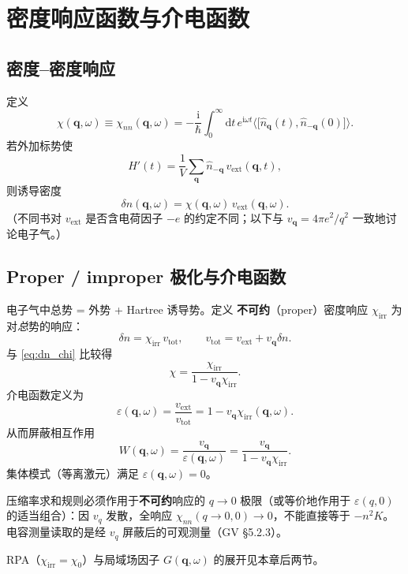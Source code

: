 \section{密度响应函数与介电函数}

\subsection{密度--密度响应}

定义
\begin{equation}
  \chi(\mathbf{q},\omega)
  \equiv\chi_{nn}(\mathbf{q},\omega)
  =-\frac{\mathrm{i}}{\hbar}
  \int_0^{\infty}\mathrm{d}t\,
  e^{\mathrm{i}\omega t}
  \bigl\langle
  \bigl[\hat n_{\mathbf{q}}(t),\hat n_{-\mathbf{q}}(0)\bigr]
  \bigr\rangle.
\label{eq:chinndef}
\end{equation}
若外加标势使
\begin{equation}
  H'(t)
  =\frac{1}{V}\sum_{\mathbf{q}}
  \hat n_{-\mathbf{q}}\,
  v_{\mathrm{ext}}(\mathbf{q},t),
\end{equation}
则诱导密度
\begin{equation}
  \delta n(\mathbf{q},\omega)
  =\chi(\mathbf{q},\omega)\,
  v_{\mathrm{ext}}(\mathbf{q},\omega).
\label{eq:dn_chi}
\end{equation}
（不同书对 $v_{\mathrm{ext}}$ 是否含电荷因子 $-e$ 的约定不同；以下与 $v_{\mathbf{q}}=4\pi e^2/q^2$ 一致地讨论电子气。）

\subsection{Proper / improper 极化与介电函数}

电子气中总势 = 外势 + Hartree 诱导势。定义 \textbf{不可约}（proper）密度响应 $\chi_{\mathrm{irr}}$ 为对\textit{总}势的响应：
\begin{equation}
  \delta n=\chi_{\mathrm{irr}}\,v_{\mathrm{tot}},
  \qquad
  v_{\mathrm{tot}}=v_{\mathrm{ext}}+v_{\mathbf{q}}\delta n.
\end{equation}
与 \eqref{eq:dn_chi} 比较得
\begin{equation}
  \chi
  =\frac{\chi_{\mathrm{irr}}}
  {1-v_{\mathbf{q}}\chi_{\mathrm{irr}}}.
\label{eq:chi_irr}
\end{equation}
介电函数定义为
\begin{equation}
  \varepsilon(\mathbf{q},\omega)
  =\frac{v_{\mathrm{ext}}}{v_{\mathrm{tot}}}
  =1-v_{\mathbf{q}}\chi_{\mathrm{irr}}(\mathbf{q},\omega).
\label{eq:eps_def}
\end{equation}
从而屏蔽相互作用
\begin{equation}
  W(\mathbf{q},\omega)
  =\frac{v_{\mathbf{q}}}{\varepsilon(\mathbf{q},\omega)}
  =\frac{v_{\mathbf{q}}}{1-v_{\mathbf{q}}\chi_{\mathrm{irr}}}.
\end{equation}
集体模式（等离激元）满足 $\varepsilon(\mathbf{q},\omega)=0$。

压缩率求和规则必须作用于\textbf{不可约}响应的 $q\to0$ 极限（或等价地作用于 $\varepsilon(q,0)$ 的适当组合）：因 $v_q$ 发散，全响应 $\chi_{nn}(q\to0,0)\to0$，不能直接等于 $-n^2K$。电容测量读取的是经 $v_q$ 屏蔽后的可观测量（GV §5.2.3）。

RPA（$\chi_{\mathrm{irr}}=\chi_0$）与局域场因子 $G(\mathbf{q},\omega)$ 的展开见本章后两节。